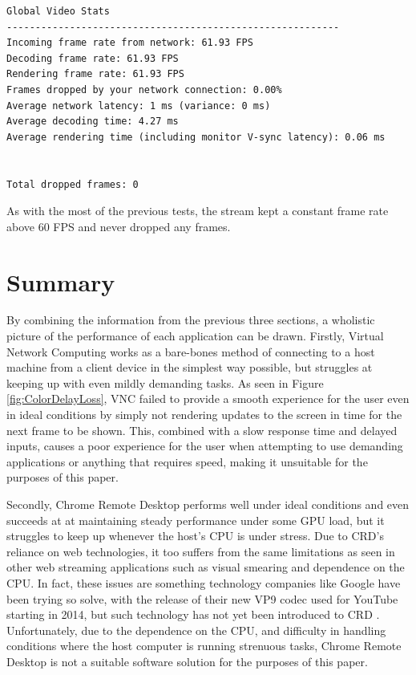 \begin{lstlisting}[style=plaintext,title=Statistics recorded while streaming the development of a video game level (Figure \ref{fig:RealWorldGameDev})]
Global Video Stats
----------------------------------------------------------
Incoming frame rate from network: 61.93 FPS
Decoding frame rate: 61.93 FPS
Rendering frame rate: 61.93 FPS
Frames dropped by your network connection: 0.00%
Average network latency: 1 ms (variance: 0 ms)
Average decoding time: 4.27 ms
Average rendering time (including monitor V-sync latency): 0.06 ms


Total dropped frames: 0
\end{lstlisting}

As with the most of the previous tests, the stream kept a constant frame rate above 60 FPS and never dropped any frames.


\section{Summary}\label{sec:EvaluationSummary}

By combining the information from the previous three sections, a wholistic picture of the performance of each application can be drawn. Firstly, Virtual Network Computing works as a bare-bones method of connecting to a host machine from a client device in the simplest way possible, but struggles at keeping up with even mildly demanding tasks.
As seen in Figure \ref{fig:ColorDelayLoss}, VNC failed to provide a smooth experience for the user even in ideal conditions by simply not rendering updates to the screen in time for the next frame to be shown.
This, combined with a slow response time and delayed inputs, causes a poor experience for the user when attempting to use demanding applications or anything that requires speed, making it unsuitable for the purposes of this paper.

Secondly, Chrome Remote Desktop performs well under ideal conditions and even succeeds at at maintaining steady performance under some GPU load, but it struggles to keep up whenever the host's CPU is under stress.
Due to CRD's reliance on web technologies, it too suffers from the same limitations as seen in other web streaming applications such as visual smearing and dependence on the CPU.
In fact, these issues are something technology companies like Google have been trying so solve, with the release of their new VP9 codec used for YouTube starting in 2014, but such technology has not yet been introduced to CRD \cite{google_io_vp9}.
Unfortunately, due to the dependence on the CPU, and difficulty in handling conditions where the host computer is running strenuous tasks, Chrome Remote Desktop is not a suitable software solution for the purposes of this paper.

